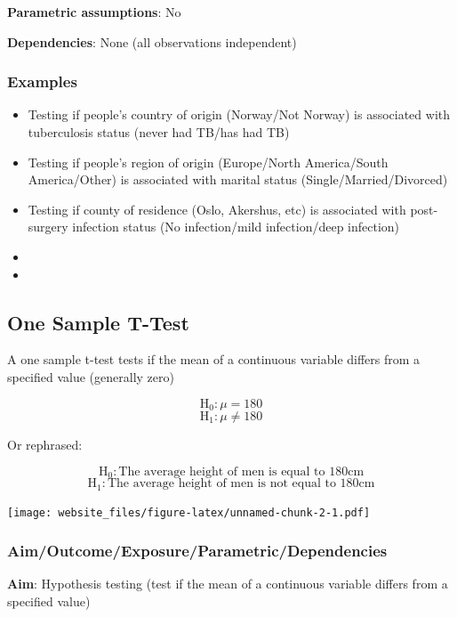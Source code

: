 \documentclass[12pt,]{article}
\providecommand{\tightlist}{%
  \setlength{\itemsep}{0pt}\setlength{\parskip}{0pt}}
\begin{document}
\textbf{Parametric assumptions}: No

\textbf{Dependencies}: None (all observations independent)

\subsubsection{Examples}\label{examples}

\begin{itemize}
\tightlist
\item
  Testing if people's country of origin (Norway/Not Norway) is
  associated with tuberculosis status (never had TB/has had TB)
\item
  Testing if people's region of origin (Europe/North America/South
  America/Other) is associated with marital status
  (Single/Married/Divorced)
\item
  Testing if county of residence (Oslo, Akershus, etc) is associated
  with post-surgery infection status (No infection/mild infection/deep
  infection)
\item
  \hfill \break
  \hfill \break
\item
  \hfill \break
  \hfill \break
\end{itemize}

\newpage

\subsection{One Sample T-Test}\label{one-sample-t-test}

A one sample t-test tests if the mean of a continuous variable differs
from a specified value (generally zero)

\[\text{H}_0: \mu = 180\] \[\text{H}_1: \mu \ne 180\]

Or rephrased:

\[\text{H}_0: \text{The average height of men is equal to 180cm}\]
\[\text{H}_1: \text{The average height of men is not equal to 180cm}\]

\texttt{[image: website\_files/figure-latex/unnamed-chunk-2-1.pdf]}

\subsubsection{Aim/Outcome/Exposure/Parametric/Dependencies}\label{aimoutcomeexposureparametricdependencies-1}

\textbf{Aim}: Hypothesis testing (test if the mean of a continuous
variable differs from a specified value)
\end{document}
